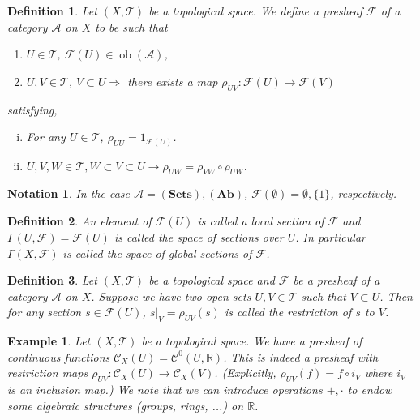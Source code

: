 \documentclass{article}
\newtheorem{definition}{Definition}[section]
\newtheorem{notation}{Notation}[section]
\newtheorem{example}{Example}[section]
\numberwithin{equation}{section}
\DeclareMathOperator{\ob}{ob}
\begin{document}
\begin{definition}
Let $(X,\mathcal{T})$ be a topological space. We define a presheaf $\mathcal{F}$ of a category $\mathcal{A}$ on $X$ to be such that 
\begin{enumerate}[\textbullet]
\item $U\in\mathcal{T}$, $\mathcal{F}(U)\in\ob(\mathcal{A})$,
\item $U,V\in\mathcal{T}$, $V\subset U \Rightarrow $ there exists a map $\rho_{UV}:\mathcal{F}(U)\to\mathcal{F}(V)$ 
\end{enumerate}

satisfying,
\begin{enumerate}[i).]
\item For any $U\in\mathcal{T}$, $\rho_{UU}=1_{\mathcal{F}(U)}$.
\item $U,V,W\in\mathcal{T}, W\subset V\subset U\rightarrow \rho_{UW}=\rho_{VW}\circ\rho_{UW}$.
\end{enumerate}
\end{definition}

\begin{notation}
In the case $\mathcal{A} = (\mathbf{Sets}),(\mathbf{Ab})$, $\mathcal{F}(\emptyset)=\emptyset,\{1\}$, respectively.
\end{notation}

\begin{definition}
An element of $\mathcal{F}(U)$ is called a local section of $\mathcal{F}$ and $\Gamma(U,\mathcal{F}) = \mathcal{F}(U)$ is called the space of sections over $U$. In particular $\Gamma(X,\mathcal{F})$ is called the space of global sections of $\mathcal{F}$.
\end{definition}

\begin{definition}
Let $(X,\mathcal{T})$ be a topological space and $\mathcal{F}$ be a presheaf of a category $\mathcal{A}$ on $X$. Suppose we have two open sets $U,V\in\mathcal{T}$ such that $V\subset U$. Then for any section $s\in\mathcal{F}(U)$, $s|_V=\rho_{UV}(s)$ is called the restriction of $s$ to $V$.
\end{definition}

\begin{example}
Let $(X,\mathcal{T})$ be a topological space. We have a presheaf of continuous functions $\mathcal{C}_X(U)=\mathcal{C}^0(U,\mathbb{R})$. This is indeed a presheaf with restriction maps $\rho_{UV}:\mathcal{C}_X(U)\to\mathcal{C}_X(V)$. (Explicitly, $\rho_{UV}(f) = f\circ i_V$ where $i_V$ is an inclusion map.)  We note that we can introduce operations $+,\cdot$ to endow some algebraic structures (groups, rings, ...) on $\mathbb{R}$.
\end{example}
\end{document}
